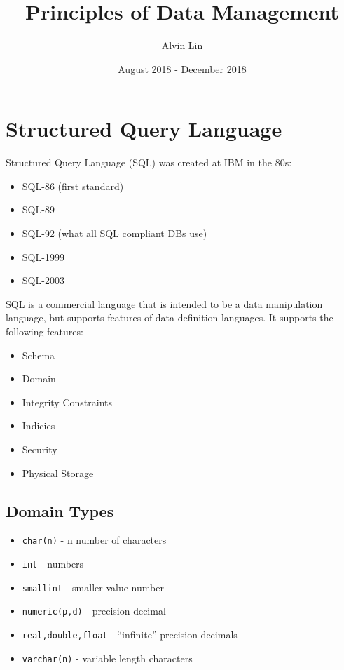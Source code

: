 \documentclass{math}
\title{Principles of Data Management}
\author{Alvin Lin}
\date{August 2018 - December 2018}
\begin{document}
\lstset{basicstyle=\ttfamily\footnotesize,breaklines=true}
\maketitle

\section*{Structured Query Language}
Structured Query Language (SQL) was created at IBM in the 80s:
\begin{itemize}
  \item SQL-86 (first standard)
  \item SQL-89
  \item SQL-92 (what all SQL compliant DBs use)
  \item SQL-1999
  \item SQL-2003
\end{itemize}
SQL is a commercial language that is intended to be a data manipulation
language, but supports features of data definition languages. It supports the
following features:
\begin{itemize}
  \item Schema
  \item Domain
  \item Integrity Constraints
  \item Indicies
  \item Security
  \item Physical Storage
\end{itemize}

\subsection*{Domain Types}
\begin{itemize}
  \item \texttt{char(n)} - n number of characters
  \item \texttt{int} - numbers
  \item \texttt{smallint} - smaller value number
  \item \texttt{numeric(p,d)} - precision decimal
  \item \texttt{real,double,float} - ``infinite'' precision decimals
  \item \texttt{varchar(n)} - variable length characters
\end{itemize}
\end{document}
